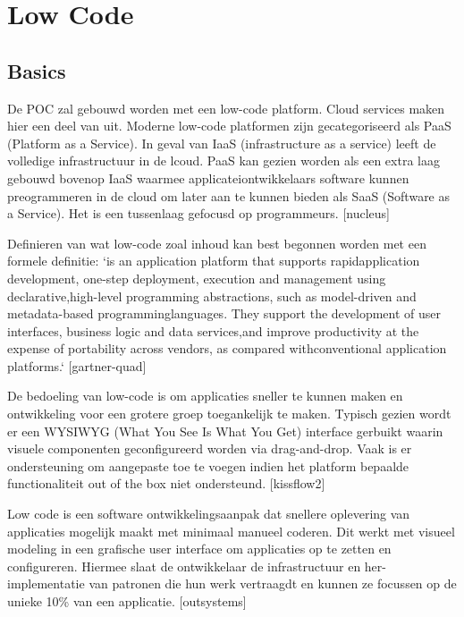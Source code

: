 
\section{Low Code}

\subsection{Basics}

De POC zal gebouwd worden met een low-code platform. Cloud services maken hier een deel van uit. Moderne low-code platformen zijn gecategoriseerd als PaaS (Platform as a Service). In geval van IaaS (infrastructure as a service) leeft de volledige infrastructuur in de lcoud. PaaS kan gezien worden als een extra laag gebouwd bovenop IaaS waarmee applicateiontwikkelaars software kunnen preogrammeren in de cloud om later aan te kunnen bieden als SaaS (Software as a Service). Het is een tussenlaag gefocusd op programmeurs. [nucleus]

Definieren van wat low-code zoal inhoud kan best begonnen worden met een formele definitie:
`is an application platform that supports rapidapplication development, one-step deployment, execution and management using declarative,high-level programming abstractions, such as model-driven and metadata-based programminglanguages. They support the development of user interfaces, business logic and data services,and improve productivity at the expense of portability across vendors, as compared withconventional application platforms.` [gartner-quad]

De bedoeling van low-code is om applicaties sneller te kunnen maken en ontwikkeling voor een grotere groep toegankelijk te maken. Typisch gezien wordt er een WYSIWYG (What You See Is What You Get) interface gerbuikt waarin visuele componenten geconfigureerd worden via drag-and-drop. Vaak is er ondersteuning om aangepaste toe te voegen indien het platform bepaalde functionaliteit out of the box niet ondersteund. [kissflow2]

Low code is een software ontwikkelingsaanpak dat snellere oplevering van applicaties mogelijk maakt met minimaal manueel coderen. Dit werkt met visueel modeling in een grafische user interface om applicaties op te zetten en configureren. Hiermee slaat de ontwikkelaar de infrastructuur en her-implementatie van patronen die hun werk vertraagdt en kunnen ze focussen op de unieke 10\% van een applicatie. [outsystems]

